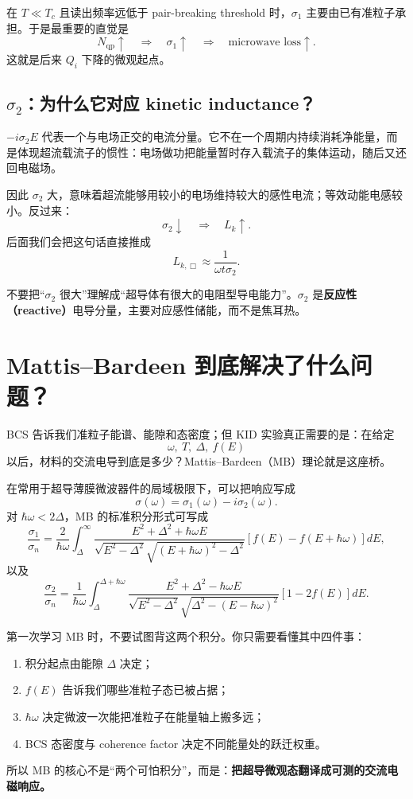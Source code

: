 \documentclass[11pt,a4paper,openany]{ctexrep}
\newcommand{\qp}{\mathrm{qp}}
\begin{document}
在 $T\ll T_c$ 且读出频率远低于 pair-breaking threshold 时，$\sigma_1$ 主要由已有准粒子承担。于是最重要的直觉是
\[
\boxed{
N_{\qp}\uparrow\quad\Longrightarrow\quad\sigma_1\uparrow\quad\Longrightarrow\quad\text{microwave loss}\uparrow.
}
\]
这就是后来 $Q_i$ 下降的微观起点。

\subsection{$\sigma_2$：为什么它对应 kinetic inductance？}

$-i\sigma_2E$ 代表一个与电场正交的电流分量。它不在一个周期内持续消耗净能量，而是体现超流载流子的惯性：电场做功把能量暂时存入载流子的集体运动，随后又还回电磁场。

因此 $\sigma_2$ 大，意味着超流能够用较小的电场维持较大的感性电流；等效动能电感较小。反过来：
\[
\boxed{
\sigma_2\downarrow
\quad\Longrightarrow\quad
L_k\uparrow.
}
\]
后面我们会把这句话直接推成
\[
L_{k,\Box}\approx\frac{1}{\omega t\sigma_2}.
\]

\begin{mistakebox}
不要把“$\sigma_2$ 很大”理解成“超导体有很大的电阻型导电能力”。$\sigma_2$ 是\textbf{反应性（reactive）}电导分量，主要对应感性储能，而不是焦耳热。
\end{mistakebox}

\section{Mattis--Bardeen 到底解决了什么问题？}

BCS 告诉我们准粒子能谱、能隙和态密度；但 KID 实验真正需要的是：在给定
\[
\omega,\ T,\ \Delta,\ f(E)
\]
以后，材料的交流电导到底是多少？Mattis--Bardeen（MB）理论就是这座桥。

在常用于超导薄膜微波器件的局域极限下，可以把响应写成
\[
\boxed{
\sigma(\omega)=\sigma_1(\omega)-i\sigma_2(\omega).
}
\]
对 $\hbar\omega<2\Delta$，MB 的标准积分形式可写成
\[
\frac{\sigma_1}{\sigma_n}
=
\frac{2}{\hbar\omega}
\int_{\Delta}^{\infty}
\frac{E^2+\Delta^2+\hbar\omega E}
{\sqrt{E^2-\Delta^2}\sqrt{(E+\hbar\omega)^2-\Delta^2}}
\left[f(E)-f(E+\hbar\omega)\right]dE,
\]
以及
\[
\frac{\sigma_2}{\sigma_n}
=
\frac{1}{\hbar\omega}
\int_{\Delta}^{\Delta+\hbar\omega}
\frac{E^2+\Delta^2-\hbar\omega E}
{\sqrt{E^2-\Delta^2}\sqrt{\Delta^2-(E-\hbar\omega)^2}}
\left[1-2f(E)\right]dE.
\]

\begin{intuitionbox}
第一次学习 MB 时，不要试图背这两个积分。你只需要看懂其中四件事：
\begin{enumerate}
  \item 积分起点由能隙 $\Delta$ 决定；
  \item $f(E)$ 告诉我们哪些准粒子态已被占据；
  \item $\hbar\omega$ 决定微波一次能把准粒子在能量轴上搬多远；
  \item BCS 态密度与 coherence factor 决定不同能量处的跃迁权重。
\end{enumerate}
所以 MB 的核心不是“两个可怕积分”，而是：\textbf{把超导微观态翻译成可测的交流电磁响应。}
\end{intuitionbox}
\end{document}
